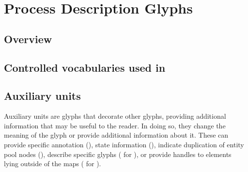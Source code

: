 
\chapter{Process Description Glyphs}
\label{chp:glyphs}



\section{Overview}



\section{Controlled vocabularies used in \SBGNPDLone}\label{sec:CVs}



\section{Auxiliary units}

Auxiliary units are glyphs that decorate other glyphs, providing additional information that may be useful to the reader.
In doing so, they change the meaning of the glyph or provide additional information about it.
These can provide specific annotation (), state information (), indicate duplication of entity pool nodes (), describe specific glyphs ( for ), or provide handles to elements lying outside of the maps ( for ).







